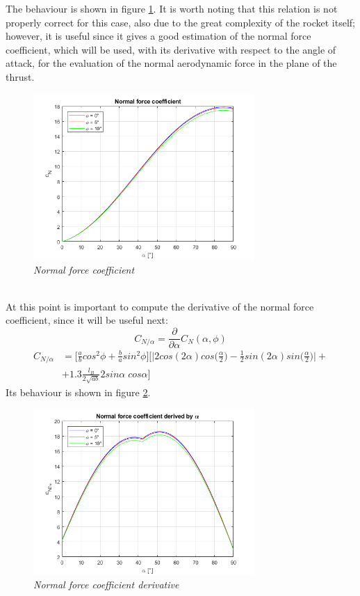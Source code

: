 \documentclass[12pt,fleqn,openany]{book} %
\begin{document}
The behaviour is shown in figure \hypertarget{fig:normf}{\ref{fig:normf}}. It is worth noting that this relation is not properly correct for this case, also due to the great complexity of the rocket itself; however, it is useful since it gives a good estimation of the normal force coefficient, which will be used, with its derivative with respect to the angle of attack, for the evaluation of the normal aerodynamic force in the plane of the thrust. 
\begin{figure}[h]
 \centering
 \includegraphics[width=0.75\textwidth]{normf}
 \caption{\emph{Normal force coefficient}}
 \label{fig:normf}
\end{figure}\\
At this point is important to compute the derivative of the normal force coefficient, since it will be useful next: 
\begin{equation}
 C_{N/\alpha}=\frac{\partial}{\partial\alpha}C_N(\alpha,\phi)
\end{equation}
\begin{equation}\begin{split}
 C_{N/\alpha}&=\Biggl[\frac{a}{b}cos^2\phi+\frac{b}{a}sin^2\phi\Biggr]\Biggl[\Biggl|2cos(2\alpha)cos\biggl(\frac{\alpha}{2}\biggr)-\frac{1}{2}sin(2\alpha)sin\biggl(\frac{\alpha}{2}\biggr)\Biggr|+\\
 &+1.3\frac{l_B}{2\sqrt{ab}}2sin\alpha\; cos\alpha\Biggr]
\end{split}\end{equation}
Its behaviour is shown in figure \hypertarget{fig:normfa}{\ref{fig:normfa}}.
\begin{figure}[h]
 \centering
 \includegraphics[width=0.75\textwidth]{normfa}
 \caption{\emph{Normal force coefficient derivative}}
 \label{fig:normfa}
\end{figure}
\end{document}
